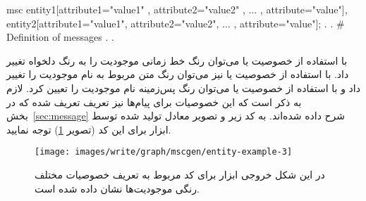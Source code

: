 \begin{MSC}
msc {
	entity1[attribute1="value1" , attribute2="value2" , ... ,
	attribute="value"],
	entity2[attribute1="value1", attribute2="value2", ... ,
	attribute="value"];
	.
	.
	# Definition of messages
	.
	.
}
\end{MSC}

با استفاده از خصوصیت  یا  می‌توان رنگ خط زمانی
موجودیت را به رنگ دلخواه تغییر داد. با استفاده از خصوصیت  یا
 نیز می‌توان رنگ متن مربوط به نام موجودیت را تغییر داد و
با استفاده از خصوصیت  یا  می‌توان رنگ پس‌زمینه
نام موجودیت را تعیین کرد. لازم به ذکر است که این خصوصیات برای پیام‌ها نیز تعریف
تعریف شده که در بخش~\ref{sec:message} شرح داده شده‌اند. به کد زیر و تصویر معادل
تولید شده توسط ابزار  برای این کد (تصویر \ref{images/write/graph/mscgen/entity-example-3}) توجه نمایید.


\begin{figure}[h]
	\centering
	\texttt{[image: images/write/graph/mscgen/entity-example-3]}
	\caption[مثالی از نحوه تعریف خصوصیات مختلف موجودیت‌ها]
	{در این شکل خروجی ابزار  برای کد مربوط به تعریف خصوصیات
	مختلف رنگی موجودیت‌ها نشان داده شده است.}
	\label{images/write/graph/mscgen/entity-example-3}
\end{figure}
 
